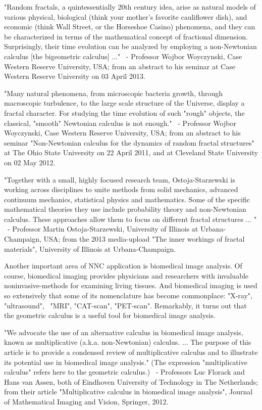 \documentclass[12pt]{article}
\begin{document}
"Random fractals, a quintessentially 20th century idea, arise as natural models of various physical, biological (think your mother's favorite cauliflower dish), and economic (think Wall Street, or the Horseshoe Casino) phenomena, and they can be characterized in terms of the mathematical concept of fractional dimension. Surprisingly, their time evolution can be analyzed by employing a non-Newtonian calculus [the bigeometric calculus] ..."
 - Professor Wojbor Woyczynski, Case Western Reserve University, USA; from an abstract to his seminar at Case Western Reserve University on 03 April 2013.

"Many natural phenomena, from microscopic bacteria growth, through macroscopic turbulence, to the large scale structure of the Universe, display a fractal character. For studying the time evolution of such "rough" objects, the classical, "smooth" Newtonian calculus is not enough."
 - Professor Wojbor Woyczynski, Case Western Reserve University, USA; from an abstract to his seminar "Non-Newtonian calculus for the dynamics of random fractal structures" at The Ohio State University on 22 April 2011, and at Cleveland State University on 02 May 2012.

"Together with a small, highly focused research team, Ostoja-Starzewski is working across disciplines to unite methods from solid mechanics, advanced continuum mechanics, statistical physics and mathematics. Some of the specific mathematical theories they use include probability theory and non-Newtonian calculus. These approaches allow them to focus on different fractal structures ... "
 - Professor Martin Ostoja-Starzewski, University of Illinois at Urbana-Champaign, USA; from the 2013 media-upload "The inner workings of fractal materials", University of Illinois at Urbana-Champaign.

Another important area of NNC application is biomedical image analysis. Of course, biomedical imaging provides physicians and researchers with invaluable noninvasive-methods for examining living tissues. And biomedical imaging is used so extensively that some of its nomenclature has become commonplace: "X-ray", "ultrasound",  "MRI", "CAT-scan", "PET-scan". Remarkably, it turns out that the geometric calculus is a useful tool for biomedical image analysis.

"We advocate the use of an alternative calculus in biomedical image analysis, known as multiplicative (a.k.a. non-Newtonian) calculus. ... The purpose of this article is to provide a condensed review of multiplicative calculus and to illustrate its potential use in biomedical image analysis." (The expression "multiplicative calculus" refers here to the geometric calculus.)
 - Professors Luc Florack and Hans van Assen, both of Eindhoven University of Technology in The Netherlands; from their article "Multiplicative calculus in biomedical image analysis", Journal of Mathematical Imaging and Vision, Springer, 2012.
\end{document}
